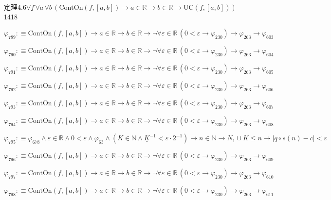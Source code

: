 \begin{fullproof}{定理4.6}{$\forall f\,\forall a\,\forall b\,(\mathrm{ContOn}(f,[a,b]) \to a \in \mathbb{R} \to b \in \mathbb{R} \to \mathrm{UC}(f,[a,b]))$}{1418}
\begin{abbrevlist}
\item $\varphi_{789} :\equiv \mathrm{ContOn}(f,[a,b]) \to a \in \mathbb{R} \to b \in \mathbb{R} \to \neg \forall \varepsilon \in \mathbb{R}\,(0 < \varepsilon \to \varphi_{230}) \to \varphi_{263} \to \varphi_{603}$
\item $\varphi_{790} :\equiv \mathrm{ContOn}(f,[a,b]) \to a \in \mathbb{R} \to b \in \mathbb{R} \to \neg \forall \varepsilon \in \mathbb{R}\,(0 < \varepsilon \to \varphi_{230}) \to \varphi_{263} \to \varphi_{604}$
\item $\varphi_{791} :\equiv \mathrm{ContOn}(f,[a,b]) \to a \in \mathbb{R} \to b \in \mathbb{R} \to \neg \forall \varepsilon \in \mathbb{R}\,(0 < \varepsilon \to \varphi_{230}) \to \varphi_{263} \to \varphi_{605}$
\item $\varphi_{792} :\equiv \mathrm{ContOn}(f,[a,b]) \to a \in \mathbb{R} \to b \in \mathbb{R} \to \neg \forall \varepsilon \in \mathbb{R}\,(0 < \varepsilon \to \varphi_{230}) \to \varphi_{263} \to \varphi_{606}$
\item $\varphi_{793} :\equiv \mathrm{ContOn}(f,[a,b]) \to a \in \mathbb{R} \to b \in \mathbb{R} \to \neg \forall \varepsilon \in \mathbb{R}\,(0 < \varepsilon \to \varphi_{230}) \to \varphi_{263} \to \varphi_{607}$
\item $\varphi_{794} :\equiv \mathrm{ContOn}(f,[a,b]) \to a \in \mathbb{R} \to b \in \mathbb{R} \to \neg \forall \varepsilon \in \mathbb{R}\,(0 < \varepsilon \to \varphi_{230}) \to \varphi_{263} \to \varphi_{608}$
\item $\varphi_{795} :\equiv \varphi_{678} \land \varepsilon \in \mathbb{R} \land 0 < \varepsilon \land \varphi_{63} \land (K \in \mathbb{N} \land \underline{K}^{-1} < \varepsilon \cdot 2^{-1}) \to n \in \mathbb{N} \to N_{1} \cup K \leq n \to \lvert q \circ s(n) - c \rvert < \varepsilon$
\item $\varphi_{796} :\equiv \mathrm{ContOn}(f,[a,b]) \to a \in \mathbb{R} \to b \in \mathbb{R} \to \neg \forall \varepsilon \in \mathbb{R}\,(0 < \varepsilon \to \varphi_{230}) \to \varphi_{263} \to \varphi_{609}$
\item $\varphi_{797} :\equiv \mathrm{ContOn}(f,[a,b]) \to a \in \mathbb{R} \to b \in \mathbb{R} \to \neg \forall \varepsilon \in \mathbb{R}\,(0 < \varepsilon \to \varphi_{230}) \to \varphi_{263} \to \varphi_{610}$
\item $\varphi_{798} :\equiv \mathrm{ContOn}(f,[a,b]) \to a \in \mathbb{R} \to b \in \mathbb{R} \to \neg \forall \varepsilon \in \mathbb{R}\,(0 < \varepsilon \to \varphi_{230}) \to \varphi_{263} \to \varphi_{611}$

\end{abbrevlist}
\end{fullproof}
